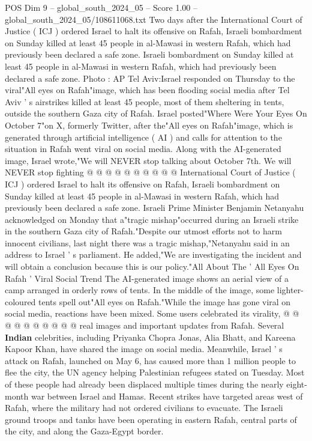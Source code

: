 \begin{textsample}{POS Dim 9 – global\_south\_2024\_05 – Score 1.00 – global\_south\_2024\_05/108611068.txt}  \label{ex:f9_pos_041}
Two days after the International Court of Justice ( ICJ ) ordered Israel to halt its offensive on Rafah, Israeli bombardment on Sunday killed at least 45 people in al-Mawasi in western Rafah, which had previously been declared a safe zone.
Israeli bombardment on Sunday killed at least 45 people in al-Mawasi in western Rafah, which had previously been declared a safe zone.
Photo : AP Tel Aviv:Israel responded on Thursday to the viral"All eyes on Rafah"image, which has been flooding social media after Tel Aviv ' s airstrikes killed at least 45 people, most of them sheltering in tents, outside the southern Gaza city of Rafah.
Israel posted"Where Were Your Eyes On October 7"on X, formerly Twitter, after the"All eyes on Rafah"image, which is generated through artificial intelligence ( AI ) and calls for attention to the situation in Rafah went viral on social media.
Along with the AI-generated image, Israel wrote,"We will NEVER stop talking about October 7th.
We will NEVER stop fighting @ @ @ @ @ @ @ @ @ @ International Court of Justice ( ICJ ) ordered Israel to halt its offensive on Rafah, Israeli bombardment on Sunday killed at least 45 people in al-Mawasi in western Rafah, which had previously been declared a safe zone.
Israeli Prime Minister Benjamin Netanyahu acknowledged on Monday that a"tragic mishap"occurred during an Israeli strike in the southern Gaza city of Rafah."Despite our utmost efforts not to harm innocent civilians, last night there was a tragic mishap,"Netanyahu said in an address to Israel ' s parliament.
He added,"We are investigating the incident and will obtain a conclusion because this is our policy."All About The ' All Eyes On Rafah ' Viral Social Trend The AI-generated image shows an aerial view of a camp arranged in orderly rows of tents.
In the middle of the image, some lighter-coloured tents spell out"All eyes on Rafah."While the image has gone viral on social media, reactions have been mixed.
Some users celebrated its virality, @ @ @ @ @ @ @ @ @ @ real images and important updates from Rafah.
Several \textbf{Indian} celebrities, including Priyanka Chopra Jonas, Alia Bhatt, and Kareena Kapoor Khan, have shared the image on social media.
Meanwhile, Israel ' s attack on Rafah, launched on May 6, has caused more than 1 million people to flee the city, the UN agency helping Palestinian refugees stated on Tuesday.
Most of these people had already been displaced multiple times during the nearly eight-month war between Israel and Hamas.
Recent strikes have targeted areas west of Rafah, where the military had not ordered civilians to evacuate.
The Israeli ground troops and tanks have been operating in eastern Rafah, central parts of the city, and along the Gaza-Egypt border.

\end{textsample}
